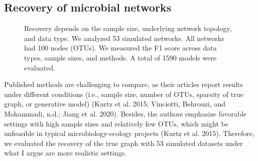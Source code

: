 \documentclass[
  a4paper,
]{article}
\begin{document}
\hypertarget{recovery-of-microbial-networks}{%
\subsection{Recovery of microbial
networks}\label{recovery-of-microbial-networks}}

\begin{figure}

\begin{minipage}[t]{\linewidth}

{\centering 


}

\end{minipage}%
\newline
\begin{minipage}[t]{\linewidth}

{\centering 


}

\end{minipage}%

\caption{\label{fig-prec_recall}Recovery depends on the sample size,
underlying network topology, and data type. We analyzed 53 simulated
networks. All networks had 100 nodes (OTUs). We measured the F1 score
across data types, sample sizes, and methods. A total of 1590 models
were evaluated.}

\end{figure}

Published methods are challenging to compare, as their articles report
results under different conditions (i.e., sample size, number of OTUs,
sparsity of true graph, or generative model) (Kurtz et al. 2015;
Vinciotti, Behrouzi, and Mohammadi, n.d.; Jiang et al. 2020). Besides,
the authors emphasize favorable settings with high sample sizes and
relatively few OTUs, which might be unfeasible in typical
microbiology-ecology projects (Kurtz et al. 2015). Therefore, we
evaluated the recovery of the true graph with 53 simulated datasets
under what I argue are more realistic settings.
\end{document}
